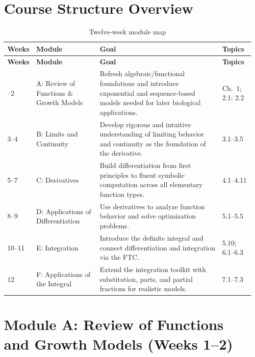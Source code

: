 \documentclass[11pt]{article}
\begin{document}
\section*{Course Structure Overview}
\begin{longtable}{p{1.6cm}p{4.2cm}p{5.3cm}p{4.5cm}}
\caption{Twelve-week module map} \\
\toprule
\textbf{Weeks} & \textbf{Module} & \textbf{Goal} & \textbf{Topics} \\
\midrule
\endfirsthead
\toprule
\textbf{Weeks} & \textbf{Module} & \textbf{Goal} & \textbf{Topics} \\
\midrule
\endhead
\bottomrule
\endfoot
1--2 & A: Review of Functions \& Growth Models & Refresh algebraic/functional foundations and introduce exponential and sequence-based models needed for later biological applications. & Ch.\ 1; 2.1; 2.2 \\
3--4 & B: Limits and Continuity & Develop rigorous and intuitive understanding of limiting behavior and continuity as the foundation of the derivative. & 3.1--3.5 \\
5--7 & C: Derivatives & Build differentiation from first principles to fluent symbolic computation across all elementary function types. & 4.1--4.11 \\
8--9 & D: Applications of Differentiation & Use derivatives to analyze function behavior and solve optimization problems. & 5.1--5.5 \\
10--11 & E: Integration & Introduce the definite integral and connect differentiation and integration via the FTC. & 5.10; 6.1--6.3 \\
12 & F: Applications of the Integral & Extend the integration toolkit with substitution, parts, and partial fractions for realistic models. & 7.1--7.3 \\
\end{longtable}

\section{Module A: Review of Functions and Growth Models (Weeks 1--2)}
\end{document}
